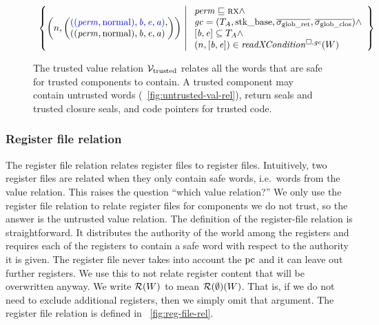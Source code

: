 \begin{jversion}
\begin{figure}
\[\begin{array}[t]{l}
    \left\{ \npair{\left(\arraycolsep=0pt\array{l} \src{((\perm,\normal),\baddr,\eaddr,\aaddr)},\\ ((\perm,\normal),\baddr,\eaddr,\aaddr) \endarray \right)} \;\middle|\; 
    \begin{array}{l}
      \perm \sqsubseteq \rx \wedge \\
      \gc = (\ta,\stkb,\gsigrets,\gsigcloss)  \wedge \\
      {} [\baddr,\eaddr] \subseteq \ta \wedge\\
      \npair{[\baddr,\eaddr]} \in \xReadCond[\square,\gc]{W} 
    \end{array}
    \right\}
  \end{array}
\]

\caption{The trusted value relation $\mathcal{V}_{\mathrm{trusted}}$ relates all the words that are safe for trusted components to contain. A trusted component may contain untrusted words (\figurename~\ref{fig:untrusted-val-rel}), return seals and trusted closure seals, and code pointers for trusted code. }
\label{fig:trusted-val-rel}
\end{figure}

\subsubsection{Register file relation}
The register file relation relates \srccm{} register files to \trgcm{} register files.
Intuitively, two register files are related when they only contain safe words, i.e.\ words from the value relation.
This raises the question ``which value relation?''
We only use the register file relation to relate register files for components we do not trust, so the answer is the untrusted value relation.
The definition of the register-file relation is straightforward.
It distributes the authority of the world among the registers and requires each of the registers to contain a safe word with respect to the authority it is given.
The register file never takes into account the $\mathrm{pc}$ and it can leave out further registers.
We use this to not relate register content that will be overwritten anyway.
We write $\mathcal{R}(W)$ to mean $\mathcal{R}(\emptyset)(W)$.
That is, if we do not need to exclude additional registers, then we simply omit that argument.
The register file relation is defined in \figurename~\ref{fig:reg-file-rel}.


\end{jversion}
